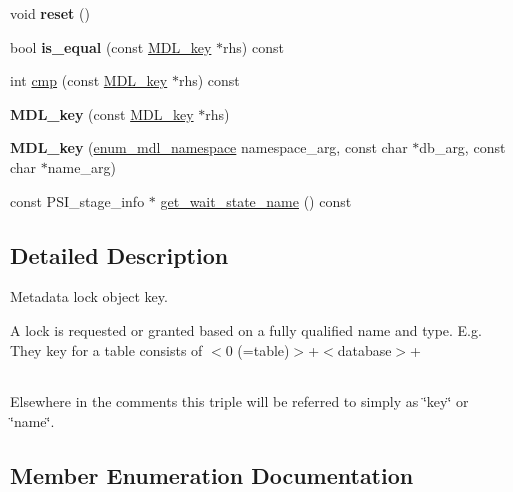 \begin{DoxyCompactItemize}
void {\bfseries reset} ()
\item 
\mbox{\label{structMDL__key_a213166cb4050445cbe7353448ef5d578}} 
bool {\bfseries is\+\_\+equal} (const \mbox{\hyperlink{structMDL__key}{M\+D\+L\+\_\+key}} $\ast$rhs) const
\item 
int \mbox{\hyperlink{structMDL__key_a0fd5e296b28b81a930cd59df5f23df59}{cmp}} (const \mbox{\hyperlink{structMDL__key}{M\+D\+L\+\_\+key}} $\ast$rhs) const
\item 
\mbox{\label{structMDL__key_afae7725965634f5248fdf3efb4f9da14}} 
{\bfseries M\+D\+L\+\_\+key} (const \mbox{\hyperlink{structMDL__key}{M\+D\+L\+\_\+key}} $\ast$rhs)
\item 
\mbox{\label{structMDL__key_abcae5989a7728de6cb2d822d7a66487b}} 
{\bfseries M\+D\+L\+\_\+key} (\mbox{\hyperlink{structMDL__key_a391ec4bd98fec6852a48f7856546ed3b}{enum\+\_\+mdl\+\_\+namespace}} namespace\+\_\+arg, const char $\ast$db\+\_\+arg, const char $\ast$name\+\_\+arg)
\item 
const P\+S\+I\+\_\+stage\+\_\+info $\ast$ \mbox{\hyperlink{structMDL__key_ac6f4051535fef0ad4f557a551bd1aa77}{get\+\_\+wait\+\_\+state\+\_\+name}} () const
\end{DoxyCompactItemize}


\subsection{Detailed Description}
Metadata lock object key.

A lock is requested or granted based on a fully qualified name and type. E.\+g. They key for a table consists of $<$0 (=table)$>$+$<$database$>$+\tabulinesep=1mm
\begin{longtabu}spread 0pt [c]{*{0}{|X[-1]}|}
\hline
\end{longtabu}
Elsewhere in the comments this triple will be referred to simply as \char`\"{}key\char`\"{} or \char`\"{}name\char`\"{}. 

\subsection{Member Enumeration Documentation}
\mbox{\label{structMDL__key_a391ec4bd98fec6852a48f7856546ed3b}} 
